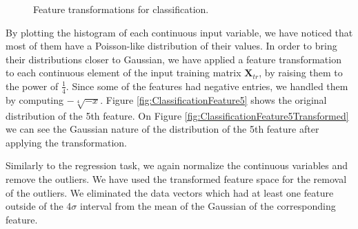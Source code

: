 \documentclass{article} %
\begin{document}
\begin{figure}[t!]
	\center
	\hfill
	\caption{Feature transformations for classification.}
\end{figure}

By plotting the histogram of each continuous input variable, we have noticed that most of them have a Poisson-like distribution of their values. In order to bring their distributions closer to Gaussian, we have applied a feature transformation to each continuous element of the input training matrix $\mathbf{X}_{tr}$, by raising them to the power of $\frac{1}{4}$. Since some of the features had negative entries, we handled them by computing $-\sqrt[4]{-x}$. Figure \ref{fig:ClassificationFeature5} shows the original distribution of the 5th feature. On Figure \ref{fig:ClassificationFeature5Transformed} we can see the Gaussian nature of the distribution of the 5th feature after applying the transformation.

Similarly to the regression task, we again normalize the continuous variables and remove the outliers. We have used the transformed feature space for the removal of the outliers. We eliminated the data vectors which had at least one feature outside of the 4$\sigma$ interval from the mean of the Gaussian of the corresponding feature.
\end{document}
